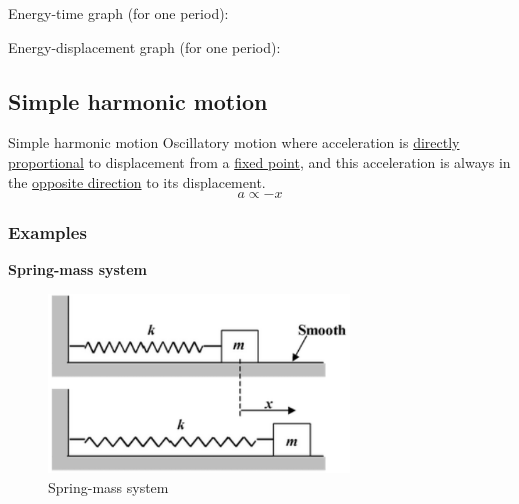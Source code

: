 Energy-time graph (for one period):
\begin{figure}[H]
\centering
{}
\end{figure}

Energy-displacement graph (for one period):
\begin{figure}[H]
\centering
{}
\end{figure}
\pagebreak

\subsection{Simple harmonic motion}
\begin{defn}{Simple harmonic motion}{}
Oscillatory motion where acceleration is \underline{directly proportional} to displacement from a \underline{fixed point}, and this acceleration is always in the \underline{opposite direction} to its displacement.
\[ a \propto -x \]
\end{defn}

\subsubsection{Examples}
\textbf{Spring-mass system}

\begin{figure}[H]
    \centering
    \includegraphics[width=8cm]{images/spring_mass_shm.png}
    \caption{Spring-mass system}
\end{figure}

